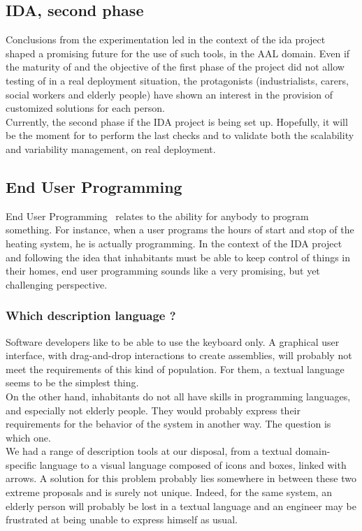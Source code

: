 \subsection{IDA, second phase}
Conclusions from the experimentation led in the context of the \gls{ida} project shaped a promising future for the use of such tools, in the AAL domain. Even if the maturity of \enti{} and the objective of the first phase of the project did not allow testing of \enti{} in a real deployment situation, the protagonists (industrialists, carers, social workers and elderly people) have shown an interest in the provision of customized solutions for each person.\\
Currently, the second phase if the IDA project is being set up. Hopefully, it will be the moment for \enti{} to perform the last checks and to validate both the scalability and variability management, on real deployment.


\subsection{End User Programming}

End User Programming~\cite{Ko:2011} relates to the ability for anybody to program something. For instance, when a user programs the hours of start and stop of the heating system, he is actually programming. In the context of the IDA project and following the idea that inhabitants must be able to keep control of things in their homes, end user programming sounds like a very promising, but yet challenging perspective.\\

\subsubsection{Which description language ?}
Software developers like to be able to use the keyboard only. A graphical user interface, with drag-and-drop interactions to create assemblies, will probably not meet the requirements of this kind of population. For them, a textual language seems to be the simplest thing.\\
On the other hand, inhabitants do not all have skills in programming languages, and especially not elderly people. They would probably express their requirements for the behavior of the system in another way. The question is which one.\\

We had a range of description tools at our disposal, from a textual domain-specific language to a visual language composed of icons and boxes, linked with arrows. A solution for this problem probably lies somewhere in between these two extreme proposals and is surely not unique. Indeed, for the same system, an elderly person will probably be lost in a textual language and an engineer may be frustrated at being unable to express himself as usual.\\

